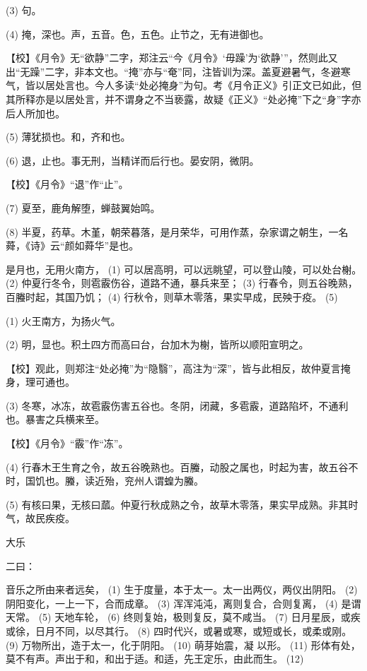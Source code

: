 \documentclass[12pt,UTF8]{ctexbook}
\begin{document}
(3) 句。

(4) 掩，深也。声，五音。色，五色。止节之，无有进御也。

【校】《月令》无“欲静”二字，郑注云“今《月令》‘毋躁’为‘欲静’”，然则此又出“无躁”二字，非本文也。“掩”亦与“奄”同，注皆训为深。盖夏避暑气，冬避寒气，皆以居处言也。今人多读“处必掩身”为句。考《月令正义》引正文已如此，但其所释亦是以居处言，并不谓身之不当亵露，故疑《正义》“处必掩”下之“身”字亦后人所加也。

(5) 薄犹损也。和，齐和也。

(6) 退，止也。事无刑，当精详而后行也。晏安阴，微阴。

【校】《月令》“退”作“止”。

(7) 夏至，鹿角解堕，蝉鼓翼始鸣。

(8) 半夏，药草。木堇，朝荣暮落，是月荣华，可用作蒸，杂家谓之朝生，一名蕣，《诗》云“颜如蕣华”是也。

是月也，无用火南方， (1) 可以居高明，可以远眺望，可以登山陵，可以处台榭。 (2) 仲夏行冬令，则雹霰伤谷，道路不通，暴兵来至； (3) 行春令，则五谷晚熟，百螣时起，其国乃饥； (4) 行秋令，则草木零落，果实早成，民殃于疫。 (5)

(1) 火王南方，为扬火气。

(2) 明，显也。积土四方而高曰台，台加木为榭，皆所以顺阳宣明之。

【校】观此，则郑注“处必掩”为“隐翳”，高注为“深”，皆与此相反，故仲夏言掩身，理可通也。

(3) 冬寒，冰冻，故雹霰伤害五谷也。冬阴，闭藏，多雹霰，道路陷坏，不通利也。暴害之兵横来至。

【校】《月令》“霰”作“冻”。

(4) 行春木王生育之令，故五谷晚熟也。百螣，动股之属也，时起为害，故五谷不时，国饥也。螣，读近殆，兖州人谓蝗为螣。

(5) 有核曰果，无核曰蓏。仲夏行秋成熟之令，故草木零落，果实早成熟。非其时气，故民疾疫。





大乐


二曰：

音乐之所由来者远矣， (1) 生于度量，本于太一。太一出两仪，两仪出阴阳。 (2) 阴阳变化，一上一下，合而成章。 (3) 浑浑沌沌，离则复合，合则复离， (4) 是谓天常。 (5) 天地车轮， (6) 终则复始，极则复反，莫不咸当。 (7) 日月星辰，或疾或徐，日月不同，以尽其行。 (8) 四时代兴，或暑或寒，或短或长，或柔或刚。 (9) 万物所出，造于太一，化于阴阳。 (10) 萌芽始震，凝 以形。 (11) 形体有处，莫不有声。声出于和，和出于适。和适，先王定乐，由此而生。 (12)
\end{document}
